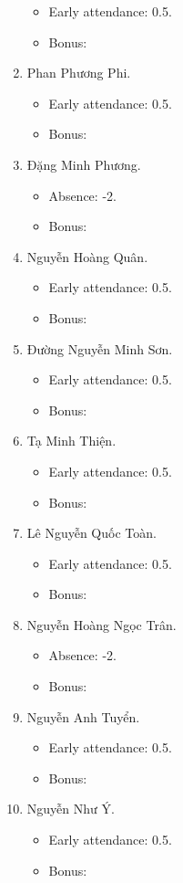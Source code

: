 \documentclass{article}
\begin{document}
\begin{enumerate}
\begin{itemize}
		\item Early attendance: 0.5.
		\item Bonus: 
	\end{itemize}
	\item {\sc Phan Phương Phi.}
	\begin{itemize}
		\item Early attendance: 0.5.
		\item Bonus: 
	\end{itemize}
	\item {\sc Đặng Minh Phương.}
	\begin{itemize}
		\item Absence: -2.
		\item Bonus: 
	\end{itemize}
	\item {\sc Nguyễn Hoàng Quân.}
	\begin{itemize}
		\item Early attendance: 0.5.
		\item Bonus: 
	\end{itemize}
	\item {\sc Đường Nguyễn Minh Sơn.}
	\begin{itemize}
		\item Early attendance: 0.5.
		\item Bonus: 
	\end{itemize}
	\item {\sc Tạ Minh Thiện.}
	\begin{itemize}
		\item Early attendance: 0.5.
		\item Bonus: 
	\end{itemize}
	\item {\sc Lê Nguyễn Quốc Toàn.}
	\begin{itemize}
		\item Early attendance: 0.5.
		\item Bonus: 
	\end{itemize}
	\item {\sc Nguyễn Hoàng Ngọc Trân.}
	\begin{itemize}
		\item Absence: -2.
		\item Bonus: 
	\end{itemize}
	\item {\sc Nguyễn Anh Tuyển.}
	\begin{itemize}
		\item Early attendance: 0.5.
		\item Bonus: 
	\end{itemize}
	\item {\sc Nguyễn Như Ý.}
	\begin{itemize}
		\item Early attendance: 0.5.
		\item Bonus: 
	\end{itemize}
\end{enumerate}
\end{document}
